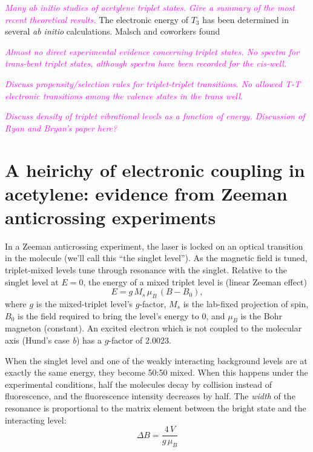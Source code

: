 \message{ !name(chapter1-introduction.tex)}\documentclass[12pt]{mitthesis}
\newcommand{\POINT}[1]{\textcolor{magenta}{\emph{#1}}}
\begin{document}
\POINT{Many ab initio studies of acetylene triplet states.  Give a
  summary of the most recent theoretical results.}  The electronic
energy of $T_3$ has been determined in several \emph{ab initio}
calculations.  Malsch and coworkers found

\POINT{Almost no direct experimental evidence concerning triplet
  states.  No spectra for trans-bent triplet states, although spectra
  have been recorded for the cis-well.}

\POINT{Discuss propensity/selection rules for triplet-triplet
  transitions.  No allowed T-T electronic transitions among the
  valence states in the trans well.}

\POINT{Discuss density of triplet vibrational levels as a function of
  energy.  Discussion of Ryan and Bryan's paper here?}


\section{A heirichy of electronic coupling in acetylene: evidence from
  Zeeman anticrossing experiments}

In a Zeeman anticrossing experiment, the laser is locked on an optical
transition in the molecule (we'll call this ``the singlet level'').
As the magnetic field is tuned, triplet-mixed levels tune through
resonance with the singlet.  Relative to the singlet level at
$E=0$, the energy of a mixed triplet level is (linear Zeeman effect)
\begin{equation}
E = g \, M_s \, \mu_B \, (B-B_0),
\end{equation}
where $g$ is the mixed-triplet level's $g$-factor, $M_s$ is the
lab-fixed projection of spin, $B_0$ is the field required to bring the
level's energy to 0, and $\mu_B$ is the Bohr magneton (constant).  An
excited electron which is not coupled to the molecular axis (Hund's
case \emph{b}) has a $g$-factor of $2.0023$.

When the singlet level and one of the weakly interacting background
levels are at exactly the same energy, they become 50:50 mixed.  When
this happens under the experimental conditions, half the molecules
decay by collision instead of fluorescence, and the fluorescence
intensity decreases by half.  The \emph{width} of the resonance is
proportional to the matrix element between the bright state and the
interacting level:
\begin{equation}
\Delta B = \frac{4\,V}{g\,\mu_B}
\end{equation}
\end{document}
